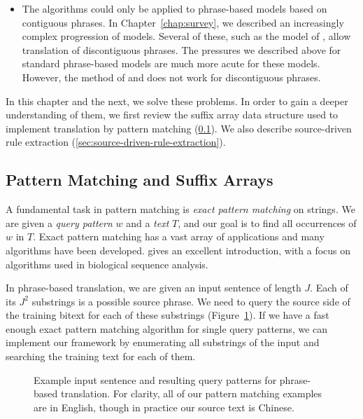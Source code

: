 \begin{itemize}
	\item The algorithms could only be applied to phrase-based models based on 
	contiguous phrases.  In Chapter~\ref{chap:survey}, we described an increasingly
	complex progression of models.  Several of these, such as the model of 
	\citet{Chiang:2005:acl,Chiang:2007:cl}, allow translation of discontiguous
	phrases.  The pressures we described above for standard
	phrase-based models are much more acute for these models.  However, the
	method of \citet{Callison-Burch:2005:acl} and \citet{Zhang:2005:eamt}
	does not work for discontiguous phrases.
\end{itemize}

In this chapter and the next, we solve these problems.  In order to 
gain a deeper understanding of them, we first review
the suffix array data structure used to implement
translation by pattern matching (\textsection\ref{sec:suffix_arrays}).  We
also describe source-driven rule extraction
(\textsection\ref{sec:source-driven-rule-extraction}).

\subsection{Pattern Matching and Suffix Arrays}\label{sec:suffix_arrays}

A fundamental task in pattern matching is {\em exact pattern matching} on strings.
We are given a {\em query pattern} $w$ and a {\em text} $T$,
and our goal is to find all occurrences of $w$ in $T$.  Exact
pattern matching has a vast array of applications and many
algorithms have been developed. \citet{Gusfield:1997:book}
gives an excellent introduction, with a focus on algorithms used in 
biological sequence analysis.  

In phrase-based translation, we are given an input sentence of length $J$.
Each of its $J^2$ substrings is a possible source phrase.  We
need to query the source side of the training bitext for each of these
substrings (Figure~\ref{fig:pb-query}).  If we have a fast enough exact
pattern matching algorithm for single query patterns,
we can implement our framework by enumerating all substrings
of the input and searching the training text for each of them.

\figpreamble
\begin{figure}
	\figfontsize{
	\begin{center}
		
	\end{center}}
	\figpostamble
	\caption[Example input sentence and resulting query patterns for phrase-based translation.]{Example input sentence and resulting query 
	patterns for phrase-based translation.
	For clarity, all of our pattern matching examples are in
	English, though in practice our source text is Chinese.}
	\label{fig:pb-query}
\end{figure}

